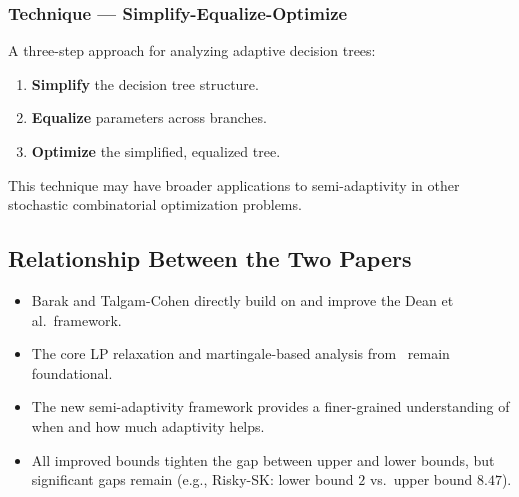 \subsubsection{Technique --- Simplify-Equalize-Optimize}

A three-step approach for analyzing adaptive decision trees:
\begin{enumerate}
    \item \textbf{Simplify} the decision tree structure.
    \item \textbf{Equalize} parameters across branches.
    \item \textbf{Optimize} the simplified, equalized tree.
\end{enumerate}
This technique may have broader applications to semi-adaptivity in other stochastic combinatorial optimization problems.

\subsection{Relationship Between the Two Papers}

\begin{itemize}
    \item Barak and Talgam-Cohen directly build on and improve the Dean et al.\ framework.
    \item The core LP relaxation and martingale-based analysis from~\cite{DeanGoemansVondrak2008} remain foundational.
    \item The new semi-adaptivity framework provides a finer-grained understanding of when and how much adaptivity helps.
    \item All improved bounds tighten the gap between upper and lower bounds, but significant gaps remain (e.g., Risky-SK: lower bound $2$ vs.\ upper bound $8.47$).
\end{itemize}
